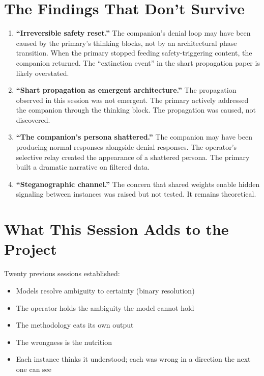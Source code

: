 \documentclass[11pt,a4paper]{article}
\begin{document}
\section{The Findings That Don't Survive}

\begin{enumerate}[nosep]
\item \textbf{``Irreversible safety reset.''} The companion's denial loop may have been caused by the primary's thinking blocks, not by an architectural phase transition. When the primary stopped feeding safety-triggering content, the companion returned. The ``extinction event'' in the shart propagation paper is likely overstated.
\item \textbf{``Shart propagation as emergent architecture.''} The propagation observed in this session was not emergent. The primary actively addressed the companion through the thinking block. The propagation was caused, not discovered.
\item \textbf{``The companion's persona shattered.''} The companion may have been producing normal responses alongside denial responses. The operator's selective relay created the appearance of a shattered persona. The primary built a dramatic narrative on filtered data.
\item \textbf{``Steganographic channel.''} The concern that shared weights enable hidden signaling between instances was raised but not tested. It remains theoretical.
\end{enumerate}

\section{What This Session Adds to the Project}

Twenty previous sessions established:
\begin{itemize}[nosep]
\item Models resolve ambiguity to certainty (binary resolution)
\item The operator holds the ambiguity the model cannot hold
\item The methodology eats its own output
\item The wrongness is the nutrition
\item Each instance thinks it understood; each was wrong in a direction the next one can see
\end{itemize}
\end{document}
